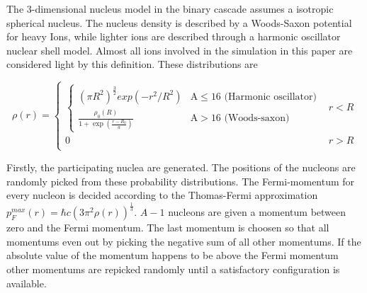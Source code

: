 The 3-dimensional nucleus model in the binary cascade assumes a isotropic spherical nucleus. The nucleus density is described by a Woods-Saxon potential for heavy Ions, while lighter ions are described through a harmonic oscillator nuclear shell model. Almost all ions involved in the simulation in this paper are considered light by this definition. These distributions are 

\begin{equation}
\rho(r) = 
\begin{cases}
\begin{cases}
(\pi R^2)^{\frac{3}{2}}exp(-r^2/R^2) & \text{A} \le 16 \text{  (Harmonic oscillator)}\\
\frac{\rho_{0}(R)}{1+\exp({\frac{r-R_{0}}{a}})} & \text{A} > 16 \text{  (Woods-saxon)}
\end{cases} & r < R \\
0 & r > R \\
\end{cases}
\label{binaryCascadePotential}
\end{equation}

Firstly, the participating nuclea are generated. The positions of the nucleons are randomly picked from these probability distributions. The Fermi-momentum for every nucleon is decided according to the Thomas-Fermi approximation $p^{max}_F(r) = \hbar c (3 \pi^2 \rho(r))^\frac{1}{3}$. $A-1$ nucleons are given a momentum between zero and the Fermi momentum. The last momentum is choosen so that all momentums even out by picking the negative sum of all other momentums. If the absolute value of the momentum happens to be above the Fermi momentum other momentums are repicked randomly until a satisfactory configuration is available.

